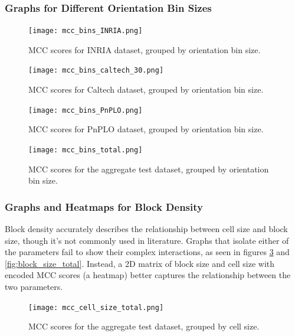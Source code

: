 \subsubsection{Graphs for Different Orientation Bin Sizes}

\begin{figure}
    \centering
    \texttt{[image: mcc\_bins\_INRIA.png]}
    \caption{
        MCC scores for INRIA dataset, grouped by orientation bin size.
    }
    \label{fig:orientation_bins_inria}
\end{figure}

\begin{figure}
    \centering
    \texttt{[image: mcc\_bins\_caltech\_30.png]}
    \caption{
        MCC scores for Caltech dataset, grouped by orientation bin size.
    }
\end{figure}

\begin{figure}
    \centering
    \texttt{[image: mcc\_bins\_PnPLO.png]}
    \caption{
        MCC scores for PnPLO dataset, grouped by orientation bin size.
    }
\end{figure}

\begin{figure}
    \centering
    \texttt{[image: mcc\_bins\_total.png]}
    \caption{
        MCC scores for the aggregate test dataset, grouped by orientation bin size.
    }
    \label{fig:orientation_bins_total}
\end{figure}


\subsubsection{Graphs and Heatmaps for Block Density}

Block density accurately describes the relationship between cell size and block size, though it's not commonly used in literature. Graphs that isolate either of the parameters fail to show their complex interactions, as seen in figures \ref{fig:cell_size_total} and \ref{fig:block_size_total}. Instead, a 2D matrix of block size and cell size with encoded MCC scores (a heatmap) better captures the relationship between the two parameters.

\begin{figure}
    \centering
    \texttt{[image: mcc\_cell\_size\_total.png]}
    \caption{
        MCC scores for the aggregate test dataset, grouped by cell size.
    }
    \label{fig:cell_size_total}
\end{figure}

